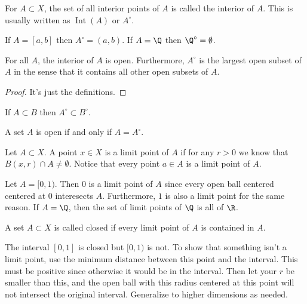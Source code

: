 \begin{definition}
For $A \subset X$, the set of all interior points of $A$ is called the interior of $A$. This is usually written as $\operatorname{Int}(A)$ or $A^\circ$.
\end{definition}

\begin{example}
If $A = [a,b]$ then $A^\circ = (a,b)$. If $A = \Q$ then $\Q^\circ = \emptyset$.
\end{example}

\begin{proposition}
For all $A$, the interior of $A$ is open. Furthermore, $A^\circ$ is the largest open subset of $A$ in the sense that it contains all other open subsets of $A$.
\end{proposition}

\begin{proof}
It's just the definitions.
\end{proof}

\begin{proposition}
If $A \subset B$ then $A^\circ \subset B^\circ$.
\end{proposition}

\begin{corollary}
A set $A$ is open if and only if $A = A^\circ$.
\end{corollary}

\begin{definition}
Let $A \subset X$. A point $x \in X$ is a limit point of $A$ if for any $r > 0$ we know that $B(x,r) \cap A \not= \emptyset$. Notice that every point $a \in A$ is a limit point of $A$.
\end{definition}

\begin{example}
Let $A = [0,1)$. Then $0$ is a limit point of $A$ since every open ball centered centered at $0$ interesects $A$. Furthermore, $1$ is also a limit point for the same reason. If $A = \Q$, then the set of limit points of $\Q$ is all of $\R$.
\end{example}

\begin{definition}
A set $A \subset X$ is called closed if every limit point of $A$ is contained in $A$.
\end{definition}

\begin{example}
The interval $[0,1]$ is closed but $[0,1)$ is not. To show that something isn't a limit point, use the minimum distance between this point and the interval. This must be positive since otherwise it would be in the interval. Then let your $r$ be smaller than this, and the open ball with this radius centered at this point will not intersect the original interval. Generalize to higher dimensions as needed.
\end{example}

